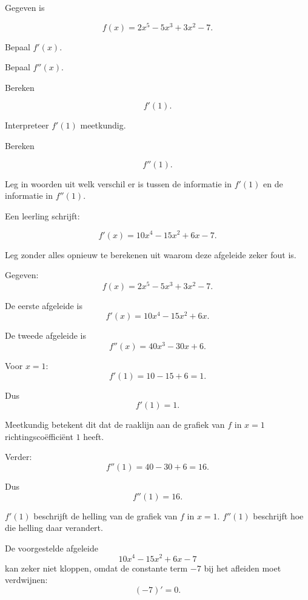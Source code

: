 \documentclass{ximera}
\begin{document}
\begin{oefening}{\oefU\ESS}

Gegeven is

\[
f(x)=2x^5-5x^3+3x^2-7.
\]

\begin{question}
Bepaal $f'(x)$.
\end{question}

\begin{question}
Bepaal $f''(x)$.
\end{question}

\begin{question}
Bereken

\[
f'(1).
\]
\end{question}

\begin{question}
Interpreteer $f'(1)$ meetkundig.
\end{question}

\begin{question}
Bereken

\[
f''(1).
\]
\end{question}

\begin{question}
Leg in woorden uit welk verschil er is tussen de informatie in
$f'(1)$ en de informatie in $f''(1)$.
\end{question}

\begin{question}
Een leerling schrijft:

\[
f'(x)=10x^4-15x^2+6x-7.
\]

Leg zonder alles opnieuw te berekenen uit waarom deze afgeleide
zeker fout is.
\end{question}

\begin{oplossing}

Gegeven:
\[
f(x)=2x^5-5x^3+3x^2-7.
\]

De eerste afgeleide is
\[
\boxed{f'(x)=10x^4-15x^2+6x}.
\]

De tweede afgeleide is
\[
\boxed{f''(x)=40x^3-30x+6}.
\]

Voor $x=1$:
\[
f'(1)=10-15+6=1.
\]

Dus
\[
\boxed{f'(1)=1}.
\]

Meetkundig betekent dit dat de raaklijn aan de grafiek van $f$ in
$x=1$ richtingscoëfficiënt $1$ heeft.

Verder:
\[
f''(1)=40-30+6=16.
\]

Dus
\[
\boxed{f''(1)=16}.
\]

$f'(1)$ beschrijft de helling van de grafiek van $f$ in $x=1$.
$f''(1)$ beschrijft hoe die helling daar verandert.

De voorgestelde afgeleide
\[
10x^4-15x^2+6x-7
\]
kan zeker niet kloppen, omdat de constante term $-7$ bij het afleiden moet
verdwijnen:
\[
(-7)'=0.
\]

\end{oplossing}

\end{oefening}



\FVDendExercises
\end{document}
